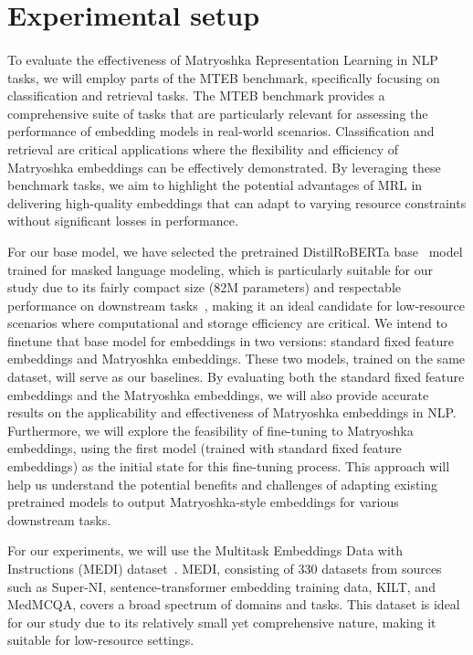 \documentclass[12pt]{article}
\begin{document}
\section{Experimental setup}

\paragraph{}
To evaluate the effectiveness of Matryoshka Representation Learning in NLP tasks, we will employ parts of the MTEB benchmark, specifically focusing on classification and retrieval tasks. The MTEB benchmark provides a comprehensive suite of tasks that are particularly relevant for assessing the performance of embedding models in real-world scenarios. Classification and retrieval are critical applications where the flexibility and efficiency of Matryoshka embeddings can be effectively demonstrated. By leveraging these benchmark tasks, we aim to highlight the potential advantages of MRL in delivering high-quality embeddings that can adapt to varying resource constraints without significant losses in performance.

For our base model, we have selected the pretrained DistilRoBERTa base~\cite{Sanh2019DistilBERTAD} model trained for masked language modeling, which is particularly suitable for our study due to its fairly compact size (82M parameters) and respectable performance on downstream tasks~\cite{sbert}, making it an ideal candidate for low-resource scenarios where computational and storage efficiency are critical. We intend to finetune that base model for embeddings in two versions: standard fixed feature embeddings and Matryoshka embeddings. These two models, trained on the same dataset, will serve as our baselines. By evaluating both the standard fixed feature embeddings and the Matryoshka embeddings, we will also provide accurate results on the applicability and effectiveness of Matryoshka embeddings in NLP. Furthermore, we will explore the feasibility of fine-tuning to Matryoshka embeddings, using the first model (trained with standard fixed feature embeddings) as the initial state for this fine-tuning process. This approach will help us understand the potential benefits and challenges of adapting existing pretrained models to output Matryoshka-style embeddings for various downstream tasks.

For our experiments, we will use the Multitask Embeddings Data with Instructions (MEDI) dataset~\cite{su-etal-2023-one}. MEDI, consisting of 330 datasets from sources such as Super-NI, sentence-transformer embedding training data, KILT, and MedMCQA, covers a broad spectrum of domains and tasks. This dataset is ideal for our study due to its relatively small yet comprehensive nature, making it suitable for low-resource settings.








\end{document}
